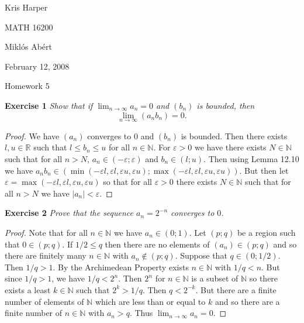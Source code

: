 \documentclass{article}
\begin{document}
\begin{flushright}
Kris Harper

MATH 16200

Mikl\'{o}s Ab\'{e}rt

February 12, 2008
\end{flushright}

\begin{center}
Homework 5
\end{center}

\begin{flushleft}

\textbf{Exercise 1}
\textsl{Show that if $\lim_{n \rightarrow \infty} a_n = 0$ and $(b_n)$ is bounded, then
\[
\lim_{n \rightarrow \infty} (a_nb_n) = 0.
\]}
\begin{proof}
We have $(a_n)$ converges to $0$ and $(b_n)$ is bounded. Then there exists $l,u \in \mathbb{R}$ such that $l \leq b_n \leq u$ for all $n \in \mathbb{N}$. For $\varepsilon > 0$ we have there exists $N \in \mathbb{N}$ such that for all $n > N$, $a_n \in (-\varepsilon ; \varepsilon)$ and $b_n \in (l;u)$. Then using Lemma 12.10 we have $a_nb_n \in (\min (-\varepsilon l, \varepsilon l, \varepsilon u, \varepsilon u) ; \max (-\varepsilon l, \varepsilon l, \varepsilon u, \varepsilon u))$. But then let $\varepsilon = \max (-\varepsilon l, \varepsilon l, \varepsilon u, \varepsilon u)$ so that for all $\varepsilon > 0$ there exists $N \in \mathbb{N}$ such that for all $n > N$ we have $|a_n| < \varepsilon$.
\end{proof}

\textbf{Exercise 2}
\textsl{Prove that the sequence $a_n=2^{-n}$ converges to $0$.}
\begin{proof}
Note that for all $n \in \mathbb{N}$ we have $a_n \in (0;1)$. Let $(p;q)$ be a region such that $0 \in (p;q)$. If $1/2 \leq q$ then there are no elements of $(a_n) \in (p;q)$ and so there are finitely many $n \in \mathbb{N}$ with $a_n \notin (p;q)$. Suppose that $q \in (0;1/2)$. Then $1/q > 1$. By the Archimedean Property exists $n \in \mathbb{N}$ with $1/q < n$. But since $1/q > 1$, we have $1/q < 2^n$. Then $2^n$ for $n \in \mathbb{N}$ is a subset of $\mathbb{N}$ so there exists a least $k \in \mathbb{N}$ such that $2^k > 1/q$. Then $q < 2^{-k}$. But there are a finite number of elements of $\mathbb{N}$ which are less than or equal to $k$ and so there are a finite number of $n \in \mathbb{N}$ with $a_n > q$. Thus $\lim_{n \rightarrow \infty} a_n = 0$.
\end{proof}


\end{flushleft}
\end{document}
